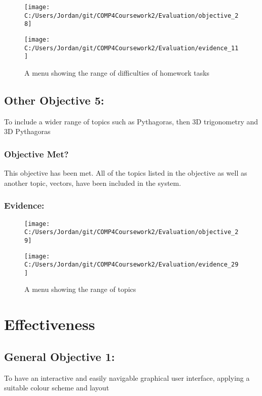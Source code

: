 \begin{figure}[H]
	\texttt{[image: C:/Users/Jordan/git/COMP4Coursework2/Evaluation/objective\_28]}
\end{figure}

\begin{figure}[H]
	\texttt{[image: C:/Users/Jordan/git/COMP4Coursework2/Evaluation/evidence\_11]}
	\caption{A menu showing the range of difficulties of homework tasks}
\end{figure}

\subsection{Other Objective 5: }

To include a wider range of topics such as Pythagoras, then 3D trigonometry and 3D Pythagoras

\subsubsection{Objective Met?}

This objective has been met. All of the topics listed in the objective as well as another topic, vectors, have been included in the system.

\subsubsection{Evidence: }

\begin{figure}[H]
	\texttt{[image: C:/Users/Jordan/git/COMP4Coursework2/Evaluation/objective\_29]}
\end{figure}

\begin{figure}[H]
	\texttt{[image: C:/Users/Jordan/git/COMP4Coursework2/Evaluation/evidence\_29]}
	\caption{A menu showing the range of topics}
\end{figure}

\section{Effectiveness}

\subsection{General Objective 1: }

To have an interactive and easily navigable graphical user interface, applying a suitable colour scheme and layout

